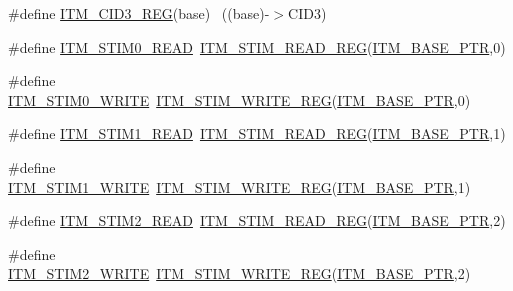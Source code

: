 \begin{DoxyCompactItemize}
\#define \hyperlink{group___i_t_m___register___accessor___macros_gade0a6ba9d22485697b0889409b4cc976}{I\+T\+M\+\_\+\+C\+I\+D3\+\_\+\+R\+EG}(base)                                          ~((base)-\/$>$C\+I\+D3)
\item 
\#define \hyperlink{group___i_t_m___register___accessor___macros_ga41eefae93b44a2616fd9feac9188bd5b}{I\+T\+M\+\_\+\+S\+T\+I\+M0\+\_\+\+R\+E\+AD}~\hyperlink{group___i_t_m___register___accessor___macros_ga5009882336aadcd4f37b45cf3395c450}{I\+T\+M\+\_\+\+S\+T\+I\+M\+\_\+\+R\+E\+A\+D\+\_\+\+R\+EG}(\hyperlink{group___i_t_m___peripheral_gafaddee8fe8b6a898d4e5edc43ee0d703}{I\+T\+M\+\_\+\+B\+A\+S\+E\+\_\+\+P\+TR},0)
\item 
\#define \hyperlink{group___i_t_m___register___accessor___macros_gac29b16f3533cac91bfa55b3ed6a9e14d}{I\+T\+M\+\_\+\+S\+T\+I\+M0\+\_\+\+W\+R\+I\+TE}~\hyperlink{group___i_t_m___register___accessor___macros_ga049ca92a4e78e77c19af81e51aa73f1c}{I\+T\+M\+\_\+\+S\+T\+I\+M\+\_\+\+W\+R\+I\+T\+E\+\_\+\+R\+EG}(\hyperlink{group___i_t_m___peripheral_gafaddee8fe8b6a898d4e5edc43ee0d703}{I\+T\+M\+\_\+\+B\+A\+S\+E\+\_\+\+P\+TR},0)
\item 
\#define \hyperlink{group___i_t_m___register___accessor___macros_ga0539c5b663891628a5157b9e06be3327}{I\+T\+M\+\_\+\+S\+T\+I\+M1\+\_\+\+R\+E\+AD}~\hyperlink{group___i_t_m___register___accessor___macros_ga5009882336aadcd4f37b45cf3395c450}{I\+T\+M\+\_\+\+S\+T\+I\+M\+\_\+\+R\+E\+A\+D\+\_\+\+R\+EG}(\hyperlink{group___i_t_m___peripheral_gafaddee8fe8b6a898d4e5edc43ee0d703}{I\+T\+M\+\_\+\+B\+A\+S\+E\+\_\+\+P\+TR},1)
\item 
\#define \hyperlink{group___i_t_m___register___accessor___macros_gadb4269a2c1aae622c11d8e38853bf0d3}{I\+T\+M\+\_\+\+S\+T\+I\+M1\+\_\+\+W\+R\+I\+TE}~\hyperlink{group___i_t_m___register___accessor___macros_ga049ca92a4e78e77c19af81e51aa73f1c}{I\+T\+M\+\_\+\+S\+T\+I\+M\+\_\+\+W\+R\+I\+T\+E\+\_\+\+R\+EG}(\hyperlink{group___i_t_m___peripheral_gafaddee8fe8b6a898d4e5edc43ee0d703}{I\+T\+M\+\_\+\+B\+A\+S\+E\+\_\+\+P\+TR},1)
\item 
\#define \hyperlink{group___i_t_m___register___accessor___macros_ga34d8d4f75c9b1761c099b65fc7b2073e}{I\+T\+M\+\_\+\+S\+T\+I\+M2\+\_\+\+R\+E\+AD}~\hyperlink{group___i_t_m___register___accessor___macros_ga5009882336aadcd4f37b45cf3395c450}{I\+T\+M\+\_\+\+S\+T\+I\+M\+\_\+\+R\+E\+A\+D\+\_\+\+R\+EG}(\hyperlink{group___i_t_m___peripheral_gafaddee8fe8b6a898d4e5edc43ee0d703}{I\+T\+M\+\_\+\+B\+A\+S\+E\+\_\+\+P\+TR},2)
\item 
\#define \hyperlink{group___i_t_m___register___accessor___macros_gaef5fd73197cf69307c400cd33e9d5c0a}{I\+T\+M\+\_\+\+S\+T\+I\+M2\+\_\+\+W\+R\+I\+TE}~\hyperlink{group___i_t_m___register___accessor___macros_ga049ca92a4e78e77c19af81e51aa73f1c}{I\+T\+M\+\_\+\+S\+T\+I\+M\+\_\+\+W\+R\+I\+T\+E\+\_\+\+R\+EG}(\hyperlink{group___i_t_m___peripheral_gafaddee8fe8b6a898d4e5edc43ee0d703}{I\+T\+M\+\_\+\+B\+A\+S\+E\+\_\+\+P\+TR},2)

\end{DoxyCompactItemize}
